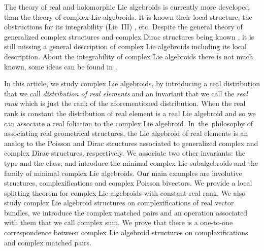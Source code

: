 \documentclass[pdftex]{sigma}
\numberwithin{equation}{section}
\begin{document}
The theory of real and holomorphic Lie algebroids is currently more developed than the theory of complex Lie algebroids. It is known their local structure, the obstructions for its integrability (Lie~III) \cite{crainic2003integrability,laurent2009integration}, etc. Despite the general theory of generalized complex structures and complex Dirac structures being known \cite{aguero2022complex, bailey2013local}, it is still missing a general description of complex Lie algebroids including its local description. About the integrability of complex Lie algebroids there is not much known, some ideas can be found in \cite{weinstein2007integration}.

In this article, we study complex Lie algebroids, by introducing a real distribution that we call {\em distribution of real elements} and an invariant that we call the {\em real rank} which is just the rank of the aforementioned distribution. When the real rank is constant the distribution of real element is a real Lie algebroid and so we can associate a real foliation to the complex Lie algebroid.
In~the~philosophy of associating real geometrical structures, the Lie algebroid of real elements is an analog to the Poisson and Dirac structures associated to generalized complex and complex Dirac structures, respectively. We associate two other invariants: the type and the class; and introduce the minimal complex Lie subalgebroids and the family of minimal complex Lie algebroids. Our main examples are involutive structures, complexifications and complex Poisson bivectors. We provide a local splitting theorem for complex Lie algebroids with constant real rank. We also study complex Lie algebroid structures on complexifications of real vector bundles, we introduce the complex matched pairs and an operation associated with them that we call complex sum. We prove that there is a one-to-one correspondence between complex Lie algebroid structures on complexifications and complex matched pairs.
\end{document}
